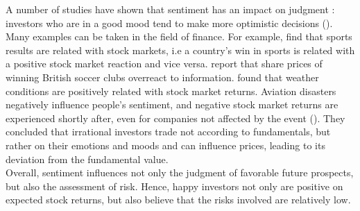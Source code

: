 \documentclass{article}
\begin{document}
	A number of studies have shown that sentiment has an impact on judgment : investors who are in a good mood tend to make more optimistic decisions (\cite{matuo}). Many examples can be taken in the field of finance. For example, \cite{ssasr} find that sports results are related with stock markets, i.e a country's win in sports is related with a positive stock market reaction and vice versa. \cite{isisa} report that share prices of winning British soccer clubs overreact to information. \cite{gdssr} found that weather conditions are positively related with stock market returns. Aviation disasters negatively influence people's sentiment, and negative stock market returns are experienced shortly after, even for companies not affected by the event (\cite{saspt}). They concluded that irrational investors trade not according to fundamentals, but rather on their emotions and moods and can influence prices, leading to its deviation from the fundamental value. \\
	
	Overall, sentiment influences not only the judgment of favorable future prospects, but also the assessment of risk. Hence, happy investors not only are positive on expected stock returns, but also believe that the risks involved are relatively low.\\
	
\end{document}
